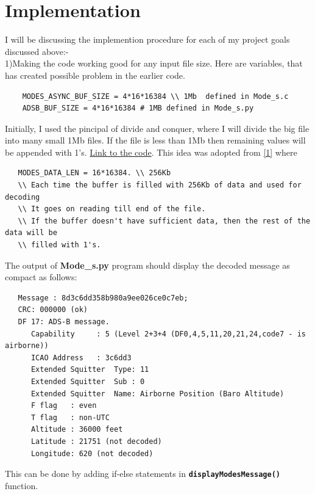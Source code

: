 \documentclass[11pt,a4paper]{report}
\begin{document}
\section{Implementation}
I will be discussing the implemention procedure for each of my project goals discussed above:- \\
1)Making the code working good for any input file size. Here are variables, that has created possible problem in the earlier code.
\begin{verbatim}
    MODES_ASYNC_BUF_SIZE = 4*16*16384 \\ 1Mb  defined in Mode_s.c
    ADSB_BUF_SIZE = 4*16*16384 # 1MB defined in Mode_s.py
\end{verbatim}
Initially, I used the pincipal of divide and conquer, where I will divide the big file into many small 1Mb files. If the file is less than 1Mb then remaining values will be appended with 1's.
\href{https://github.com/PRRvalli/libdump1090/blob/master/new_modes.py}{Link to the code}. This idea was adopted from \href{https://github.com/antirez/dump1090}{[1]} where
\begin{verbatim}
   MODES_DATA_LEN = 16*16384. \\ 256Kb
   \\ Each time the buffer is filled with 256Kb of data and used for decoding
   \\ It goes on reading till end of the file. 
   \\ If the buffer doesn't have sufficient data, then the rest of the data will be
   \\ filled with 1's.   
\end{verbatim}
The output of \textbf{Mode\_s.py} program should display the decoded message  as compact as follows: 
\begin{verbatim}
   Message : 8d3c6dd358b980a9ee026ce0c7eb;
   CRC: 000000 (ok)
   DF 17: ADS-B message.
      Capability     : 5 (Level 2+3+4 (DF0,4,5,11,20,21,24,code7 - is airborne))
      ICAO Address   : 3c6dd3
      Extended Squitter  Type: 11
      Extended Squitter  Sub : 0
      Extended Squitter  Name: Airborne Position (Baro Altitude)
      F flag   : even
      T flag   : non-UTC
      Altitude : 36000 feet
      Latitude : 21751 (not decoded)
      Longitude: 620 (not decoded)

\end{verbatim}
This can be done by adding if-else statements in \textbf{\texttt{displayModesMessage()}} function.\\
\end{document}
